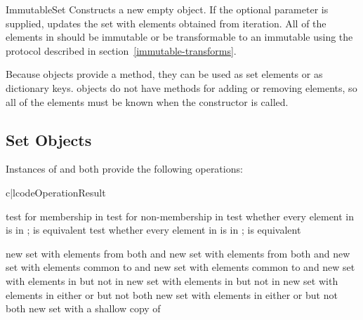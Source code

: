 \begin{classdesc}{ImmutableSet}{}
Constructs a new empty  object.  If the optional
 parameter is supplied, updates the set with elements obtained
from iteration.  All of the elements in  should be immutable or
be transformable to an immutable using the protocol described in
section~\ref{immutable-transforms}.

Because  objects provide a  method,
they can be used as set elements or as dictionary keys.  
objects do not have methods for adding or removing elements, so all of the
elements must be known when the constructor is called.
\end{classdesc}


\subsection{Set Objects \label{set-objects}}

Instances of  and  both provide
the following operations:

\begin{tableii}{c|l}{code}{Operation}{Result}

  \hline
         {test  for membership in }
         {test  for non-membership in }
         {test whether every element in  is in ;
          is equivalent}
         {test whether every element in  is in ;
          is equivalent}

  \hline
         {new set with elements from both  and }
         {new set with elements from both  and }
         {new set with elements common to  and }
         {new set with elements common to  and }
         {new set with elements in  but not in }
         {new set with elements in  but not in }
         {new set with elements in either  or  but not both}
         {new set with elements in either  or  but not both}
         {new set with a shallow copy of }
\end{tableii}


